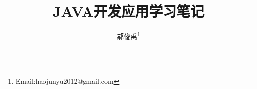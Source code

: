 \documentclass[10pt,a4paper]{article}
\begin{document}
\begin{CJK*}{UTF8}{gkai}
\title{JAVA开发应用学习笔记}					   					%
\author{郝俊禹\thanks{Email:haojunyu2012@gmail.com}}				%
\date{}                                             				%
\maketitle                                          				%
\tableofcontents 												%
\clearpage

%



\clearpage     
\end{CJK*}
\end{document}
